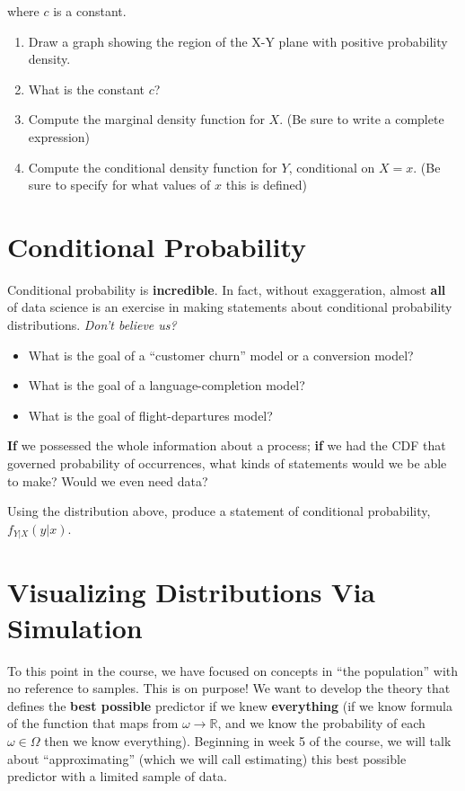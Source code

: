 \documentclass[
]{book}
\providecommand{\tightlist}{%
  \setlength{\itemsep}{0pt}\setlength{\parskip}{0pt}}
\theoremstyle{definition}
\theoremstyle{definition}
\theoremstyle{definition}
\theoremstyle{definition}
\theoremstyle{remark}
\begin{document}
where \(c\) is a constant.

\begin{enumerate}
\def\labelenumi{\arabic{enumi}.}
\tightlist
\item
  Draw a graph showing the region of the X-Y plane with positive probability density.
\item
  What is the constant \(c\)?
\item
  Compute the marginal density function for \(X\). (Be sure to write a complete expression)
\item
  Compute the conditional density function for \(Y\), conditional on \(X=x\). (Be sure to specify for what values of \(x\) this is defined)
\end{enumerate}

\section{Conditional Probability}\label{conditional-probability}

Conditional probability is \textbf{incredible}. In fact, without exaggeration, almost \textbf{all} of data science is an exercise in making statements about conditional probability distributions. \emph{Don't believe us?}

\begin{itemize}
\tightlist
\item
  What is the goal of a ``customer churn'' model or a conversion model?
\item
  What is the goal of a language-completion model?
\item
  What is the goal of flight-departures model?
\end{itemize}

\textbf{If} we possessed the whole information about a process; \textbf{if} we had the CDF that governed probability of occurrences, what kinds of statements would we be able to make? Would we even need data?

Using the distribution above, produce a statement of conditional probability, \(f_{Y|X}(y|x)\).

\section{Visualizing Distributions Via Simulation}\label{visualizing-distributions-via-simulation}

To this point in the course, we have focused on concepts in ``the population'' with no reference to samples. This is on purpose! We want to develop the theory that defines the \textbf{best possible} predictor if we knew \textbf{everything} (if we know formula of the function that maps from \(\omega \rightarrow \mathbb{R}\), and we know the probability of each \(\omega \in \Omega\) then we know everything). Beginning in week 5 of the course, we will talk about ``approximating'' (which we will call estimating) this best possible predictor with a limited sample of data.
\end{document}
